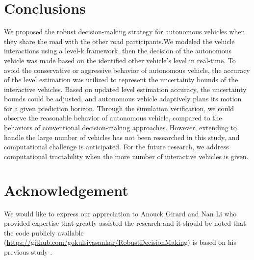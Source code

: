\documentclass[10pt,journal]{IEEEtran}
\begin{document}
	
	
	
	\section{Conclusions}
	\label{sec:conclusions}
	We proposed the robust decision-making strategy for autonomous vehicles when they share the road with the other road participants.We modeled the vehicle interactions using a level-k framework, then the decision of the autonomous vehicle was made based on the identified other vehicle's level in real-time. To avoid the conservative or aggressive behavior of autonomous vehicle, the accuracy of the level estimation was utilized to represent the uncertainty bounds of the interactive vehicles. Based on updated level estimation accuracy, the uncertainty bounds could be adjusted, and autonomous vehicle adaptively plans its motion for a given prediction horizon. Through the simulation verification, we could observe the reasonable behavior of autonomous vehicle, compared to the behaviors of conventional decision-making approaches. However, extending to handle the large number of vehicles has not been researched in this study, and computational challenge is anticipated. For the future research, we address computational tractability when the more number of interactive vehicles is given.


	\section*{Acknowledgement}
	We would like to express our appreciation to Anouck Girard and Nan Li who provided expertise that greatly assisted the research and it should be noted that the code publicly available (\url{https://github.com/gokulsivasankar/RobustDecisionMaking}) is based on his previous study \cite{Li2018}.




	
	
	
\end{document}
